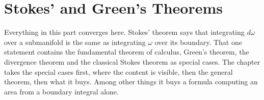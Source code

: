 \chapter{Stokes' and Green's Theorems}
\label{ch:stokes}

Everything in this part converges here. Stokes' theorem says that integrating $d\omega$ over a
submanifold is the same as integrating $\omega$ over its boundary. That one statement contains
the fundamental theorem of calculus, Green's theorem, the divergence theorem and the classical
Stokes theorem as special cases. The chapter takes the special cases first, where the content is
visible, then the general theorem, then what it buys. Among
other things it buys a formula computing an area from a boundary integral alone.








